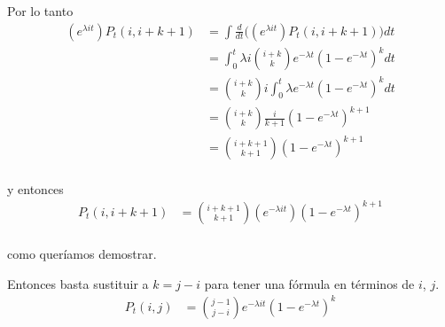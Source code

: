 Por lo tanto
\begin{align}
    (e^{\lambda i t}) P_t(i, i + k + 1)     &=  \int \frac{d}{dt} \bigg((e^{\lambda i t}) P_t(i, i + k + 1)\bigg)     dt            \\
                                            &=  \int_{0}^{t} \lambda i \binom{i + k}{k} e^{-\lambda t}(1 - e^{- \lambda t})^k    dt \\          
                                            &=  \binom{i + k}{k} i  \int_{0}^{t} \lambda  e^{-\lambda t} (1 - e^{- \lambda t})^k dt \\          
                                            &=  \binom{i + k}{k} \frac{i}{k+1}  (1-e^{- \lambda t})^{k+1}                           \\          
                                            &=  \binom{i + k + 1}{k + 1} (1-e^{- \lambda t})^{k+1}                                  \\          
\end{align}\pn

y entonces
\begin{align}
    P_t(i, i + k + 1)     &=  \binom{i + k + 1}{k + 1} (e^{-\lambda i t})(1-e^{- \lambda t})^{k+1}                                  \\
\end{align}\pn

como queríamos demostrar.

Entonces basta sustituir a $k = j - i$ para tener una fórmula en términos de $i$, $j$.\pn
\begin{align}
    P_t(i, j)     &=  \binom{j - 1}{j - i} e^{-\lambda i t} (1 - e^{- \lambda t})^k    
\end{align}\pn